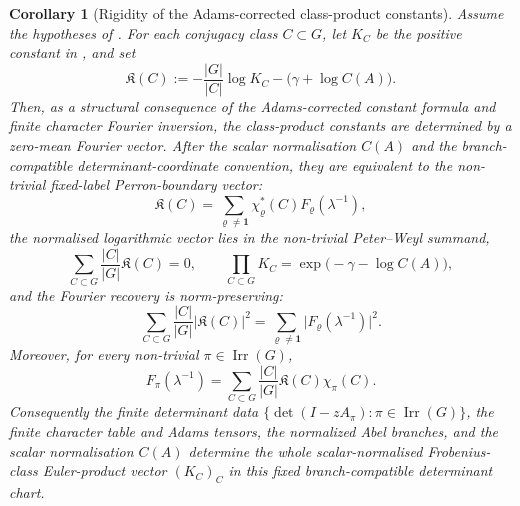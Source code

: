 \documentclass[11pt,a4paper]{amsart}
\theoremstyle{plain}
\newtheorem{corollary}[theorem]{Corollary}
\theoremstyle{definition}
\theoremstyle{remark}
\DeclareMathOperator{\Irr}{Irr}
\newcommand{\abs}[1]{\lvert #1 \rvert}
\begin{document}
\begin{corollary}[Rigidity of the Adams-corrected class-product constants]
  \label{cor:class-product-constant-rigidity}
  Assume the hypotheses of .  For each
  conjugacy class \(C\subset G\), let \(K_C\) be the positive constant in
  , and set
  \begin{equation}\label{eq:class-product-normalised-log-vector}
    \mathfrak K(C)
    :=
    -\frac{|G|}{|C|}\log K_C-\bigl(\gamma+\log C(A)\bigr).
  \end{equation}
  Then, as a structural consequence of the Adams-corrected constant formula
  and finite character Fourier inversion, the class-product constants are
  determined by a zero-mean Fourier vector.  After the scalar normalisation
  \(C(A)\) and the branch-compatible determinant-coordinate convention, they
  are equivalent to the non-trivial fixed-label Perron-boundary vector:
  \begin{equation}\label{eq:class-product-rigidity-forward}
    \mathfrak K(C)
    =
    \sum_{\varrho\neq\mathbf1}
      \chi_\varrho^\ast(C)F_\varrho(\lambda^{-1}),
  \end{equation}
  the normalised logarithmic vector lies in the non-trivial Peter--Weyl
  summand,
  \begin{equation}\label{eq:class-product-rigidity-hyperplane}
    \sum_{C\subset G}\frac{|C|}{|G|}\mathfrak K(C)=0,
    \qquad
    \prod_{C\subset G}K_C=
      \exp\!\bigl(-\gamma-\log C(A)\bigr),
  \end{equation}
  and the Fourier recovery is norm-preserving:
  \begin{equation}\label{eq:class-product-rigidity-parseval}
    \sum_{C\subset G}\frac{|C|}{|G|}\abs{\mathfrak K(C)}^2
    =
    \sum_{\varrho\neq\mathbf1}
      \abs{F_\varrho(\lambda^{-1})}^2.
  \end{equation}
  Moreover, for every non-trivial \(\pi\in\Irr(G)\),
  \begin{equation}\label{eq:class-product-rigidity-inverse}
    F_\pi(\lambda^{-1})
    =
    \sum_{C\subset G}\frac{|C|}{|G|}\mathfrak K(C)\chi_\pi(C).
  \end{equation}
  Consequently the finite determinant data
  \(\{\det(I-zA_\pi):\pi\in\Irr(G)\}\), the finite character table and
  Adams tensors, the normalized Abel branches, and the scalar normalisation
  \(C(A)\) determine the whole scalar-normalised Frobenius-class Euler-product
  vector \((K_C)_C\) in this fixed branch-compatible determinant chart.

\end{corollary}
\end{document}
